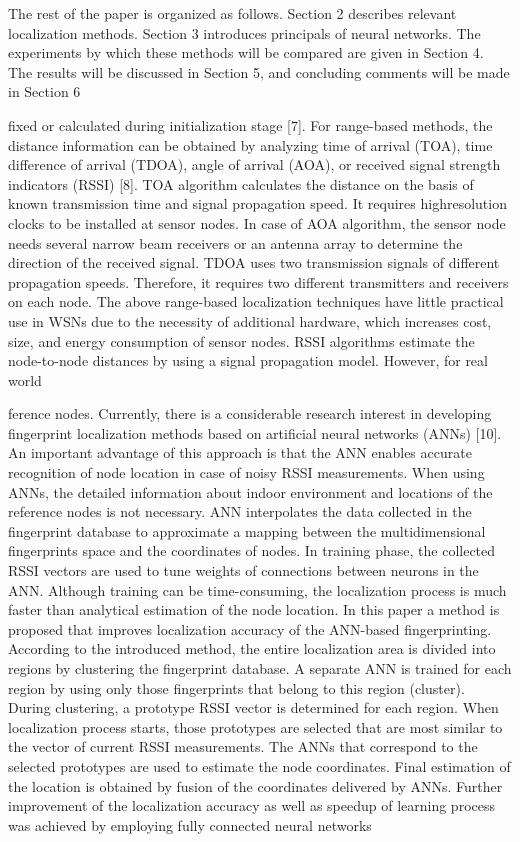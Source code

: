 \documentclass{ieeeaccess}
\begin{document}
The rest of the paper is organized as follows. Section 2 describes relevant localization methods. Section 3 introduces
principals of neural networks. The experiments by which
these methods will be compared are given in Section 4. The
results will be discussed in Section 5, and concluding comments will be made in Section 6

fixed or calculated during initialization stage [7].
For range-based methods, the distance information can
be obtained by analyzing time of arrival (TOA), time
difference of arrival (TDOA), angle of arrival (AOA), or
received signal strength indicators (RSSI) [8]. TOA algorithm
calculates the distance on the basis of known transmission time and signal propagation speed. It requires highresolution clocks to be installed at sensor nodes. In case of
AOA algorithm, the sensor node needs several narrow beam
receivers or an antenna array to determine the direction of
the received signal. TDOA uses two transmission signals
of different propagation speeds. Therefore, it requires two
different transmitters and receivers on each node. The above
range-based localization techniques have little practical use
in WSNs due to the necessity of additional hardware, which
increases cost, size, and energy consumption of sensor nodes.
RSSI algorithms estimate the node-to-node distances by
using a signal propagation model. However, for real world

ference nodes.
Currently, there is a considerable research interest in
developing fingerprint localization methods based on artificial neural networks (ANNs) [10]. An important advantage
of this approach is that the ANN enables accurate recognition of node location in case of noisy RSSI measurements.
When using ANNs, the detailed information about indoor
environment and locations of the reference nodes is not
necessary. ANN interpolates the data collected in the fingerprint database to approximate a mapping between the
multidimensional fingerprints space and the coordinates of
nodes. In training phase, the collected RSSI vectors are used
to tune weights of connections between neurons in the ANN.
Although training can be time-consuming, the localization
process is much faster than analytical estimation of the node
location.
In this paper a method is proposed that improves localization accuracy of the ANN-based fingerprinting. According
to the introduced method, the entire localization area is
divided into regions by clustering the fingerprint database.
A separate ANN is trained for each region by using only
those fingerprints that belong to this region (cluster). During
clustering, a prototype RSSI vector is determined for each
region. When localization process starts, those prototypes are
selected that are most similar to the vector of current RSSI
measurements. The ANNs that correspond to the selected
prototypes are used to estimate the node coordinates. Final
estimation of the location is obtained by fusion of the
coordinates delivered by ANNs. Further improvement of the
localization accuracy as well as speedup of learning process
was achieved by employing fully connected neural networks
\end{document}
